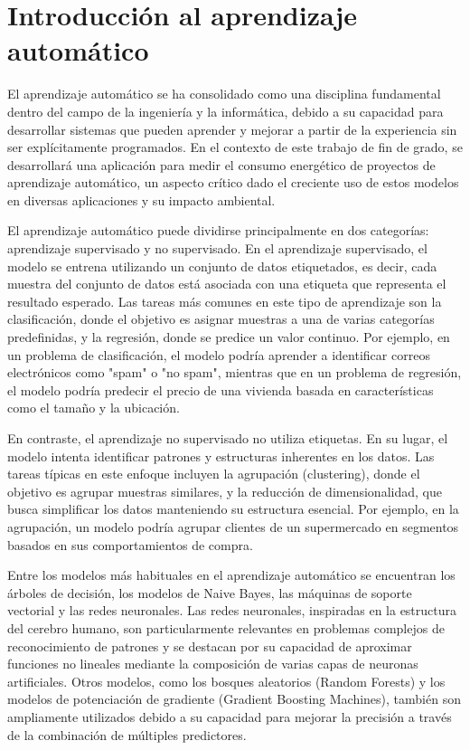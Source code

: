 \section{Introducción al aprendizaje automático}
\label{sec:intro-ml}

El aprendizaje automático se ha consolidado como una disciplina fundamental dentro del campo de la ingeniería y la informática, debido a su capacidad para desarrollar sistemas que pueden aprender y mejorar a partir de la experiencia sin ser explícitamente programados. En el contexto de este trabajo de fin de grado, se desarrollará una aplicación para medir el consumo energético de proyectos de aprendizaje automático, un aspecto crítico dado el creciente uso de estos modelos en diversas aplicaciones y su impacto ambiental.

El aprendizaje automático puede dividirse principalmente en dos categorías: aprendizaje supervisado y no supervisado. En el aprendizaje supervisado, el modelo se entrena utilizando un conjunto de datos etiquetados, es decir, cada muestra del conjunto de datos está asociada con una etiqueta que representa el resultado esperado. Las tareas más comunes en este tipo de aprendizaje son la clasificación, donde el objetivo es asignar muestras a una de varias categorías predefinidas, y la regresión, donde se predice un valor continuo. Por ejemplo, en un problema de clasificación, el modelo podría aprender a identificar correos electrónicos como "spam" o "no spam", mientras que en un problema de regresión, el modelo podría predecir el precio de una vivienda basada en características como el tamaño y la ubicación.

En contraste, el aprendizaje no supervisado no utiliza etiquetas. En su lugar, el modelo intenta identificar patrones y estructuras inherentes en los datos. Las tareas típicas en este enfoque incluyen la agrupación (clustering), donde el objetivo es agrupar muestras similares, y la reducción de dimensionalidad, que busca simplificar los datos manteniendo su estructura esencial. Por ejemplo, en la agrupación, un modelo podría agrupar clientes de un supermercado en segmentos basados en sus comportamientos de compra.

Entre los modelos más habituales en el aprendizaje automático se encuentran los árboles de decisión, los modelos de Naive Bayes, las máquinas de soporte vectorial y las redes neuronales. Las redes neuronales, inspiradas en la estructura del cerebro humano, son particularmente relevantes en problemas complejos de reconocimiento de patrones y se destacan por su capacidad de aproximar funciones no lineales mediante la composición de varias capas de neuronas artificiales. Otros modelos, como los bosques aleatorios (Random Forests) y los modelos de potenciación de gradiente (Gradient Boosting Machines), también son ampliamente utilizados debido a su capacidad para mejorar la precisión a través de la combinación de múltiples predictores.


